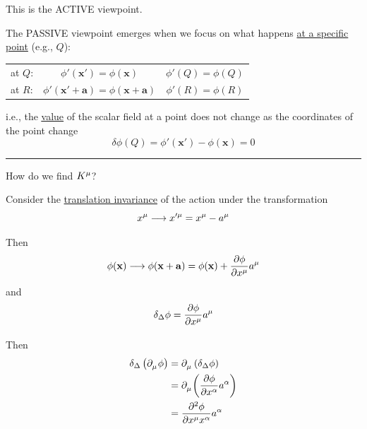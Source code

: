 \documentclass{article}
\begin{document}
\noindent This is the ACTIVE viewpoint.

\noindent The PASSIVE viewpoint emerges when we focus on what happens \underline{at a specific} \underline{point} (e.g., $Q$):

\vspace*{-16pt} \begin{center}
\begin{tabular}{lcc}
    at $Q$: & $\phi' (\mathbf{x}') = \phi (\mathbf{x})$ & $\phi' (Q) = \phi(Q)$ \\
    at $R$: & $\phi' ( \mathbf{x}' + \mathbf{a} ) = \phi ( \mathbf{x} + \mathbf{a} )$ & $\phi' (R) = \phi (R)$
\end{tabular}
\end{center} \vspace*{-16pt}

\noindent i.e., the \underline{\underline{value}} of the scalar field at a point does not change as the coordinates of the point change
\begin{equation*}
    \delta \phi (Q) = \phi' (\mathbf{x}') - \phi (\mathbf{x}) = 0
\end{equation*}

\noindent\rule{\textwidth}{.5pt}


\noindent How do we find $\tensor{K}{^\mu}$?

\noindent Consider the \underline{translation invariance} of the action under the transformation
\begin{equation*} %
    \tensor{x}{^\mu} \longrightarrow \tensor{x}{^\prime^\mu} = \tensor{x}{^\mu} - \tensor{a}{^\mu}
\end{equation*}

\noindent Then
\begin{equation*}
    \phi (\mathbf{x}) \longrightarrow \phi ( \mathbf{x} + \mathbf{a} ) = \phi (\mathbf{x}) + \dfrac{ \partial \phi }{ \partial \tensor{x}{^\mu} } \tensor{a}{^\mu}
\end{equation*}
and
\begin{equation*}
    \delta_\Delta \phi = \dfrac{ \partial \phi }{ \partial \tensor{x}{^\mu} } \tensor{a}{^\mu}
\end{equation*}

\noindent Then
\begin{align*}
    \delta_\Delta \left( \tensor{\partial}{_\mu} \phi \right) &= \tensor{\partial}{_\mu} \left( \delta_\Delta \phi \right) \\
    &= \tensor{\partial}{_\mu} \! \left( \dfrac{ \partial \phi }{ \partial \tensor{x}{^\alpha} } \tensor{a}{^\alpha} \right) \\
    &= \dfrac{ \partial^2 \phi }{ \partial \tensor{x}{^\mu} \tensor{x}{^\alpha} } \tensor{a}{^\alpha}
\end{align*}
\end{document}
